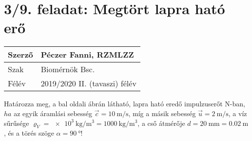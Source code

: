 
\section*{3/9. feladat: Megtört lapra ható erő}


\begin{tabular}{ | p{2cm} | p{14cm} | } 
	\hline 
	Szerző & Péczer Fanni, RZMLZZ \\
	\hline
	Szak & Biomérnök Bsc. \\
	\hline	Félév & 2019/2020 II. (tavaszi) félév  \\
	\hline
\end{tabular}
\vspace{0.5cm}

\noindent Határozza meg, a bal oldali ábrán látható, lapra ható eredő impulzuserőt N-ban, 
$ha$
az egyik áramlási sebesség $\vec{c}=\SI{10}{\meter\per\second}$,
 míg a másik sebesség $\vec{u}=\SI{2}{\meter\per\second}$,
 a víz sűrűsége $\varrho_V=\SI{e3}{\kilo\gram\per\meter\cubed}=\SI{1000}{\kilo\gram\per\meter\cubed}$,
 a cső átmérője $d=\SI{20}{\milli\meter}=\SI{0,02}{\meter}$,
 és a törés szöge	$\alpha=\SI{90}{\degree}$!

